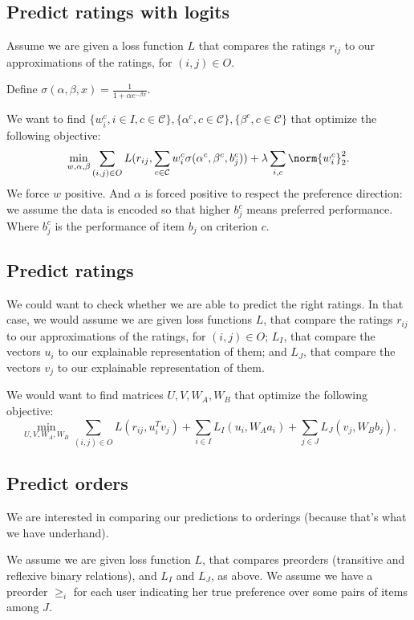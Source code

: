 \documentclass[version=last, pagesize, twoside=off, bibliography=totoc, DIV=calc, fontsize=14pt, a4paper, french, english]{scrartcl}
\begin{document}
\subsection{Predict ratings with logits}
Assume we are given a loss function $L$ that compares the ratings $r_{ij}$ to our approximations of the ratings, for $(i, j) \in O$.

Define $\sigma(\alpha, \beta, x) = \frac{1}{1+\alpha e^{-\beta x}}$.

We want to find $\{w_i^c, i \in I, c \in \mathcal{C}\}, \{\alpha^c, c \in \mathcal{C}\}, \{\beta^c, c \in \mathcal{C}\}$ that optimize the following objective:
\begin{equation}
\min_{w, \alpha, \beta} \sum_{(i, j) \in O} L(r_{ij}, \sum_{c \in \mathcal{C}} w_i^c \sigma(\alpha^c, \beta^c, b_j^c)) + \lambda \sum_{i, c} \norm{w_i^c}_2^2.
\end{equation}
We force $w$ positive. And $\alpha$ is forced positive to respect the preference direction: we assume the data is encoded so that higher $b_j^c$ means preferred performance. Where $b_j^c$ is the performance of item $b_j$ on criterion $c$.

\subsection{Predict ratings}
We could want to check whether we are able to predict the right ratings. In that case, we would assume we are given loss functions $L$, that compare the ratings $r_{ij}$ to our approximations of the ratings, for $(i, j) \in O$; $L_I$, that compare the vectors $u_i$ to our explainable representation of them; and $L_J$, that compare the vectors $v_j$ to our explainable representation of them.

We would want to find matrices $U, V, W_A, W_B$ that optimize the following objective:
\begin{equation}
\min_{U, V, W_A, W_B} \sum_{(i, j) \in O} L(r_{ij}, u_i^T v_j) + \sum_{i \in I} L_I(u_i, W_A a_i) + \sum_{j \in J} L_J(v_j, W_B b_j).
\end{equation}

\subsection{Predict orders}
We are interested in comparing our predictions to orderings (because that’s what we have underhand).

We assume we are given loss function $L$, that compares preorders (transitive and reflexive binary relations), and $L_I$ and $L_J$, as above. We assume we have a preorder $≥_i$ for each user indicating her true preference over some pairs of items among $J$.
\end{document}
